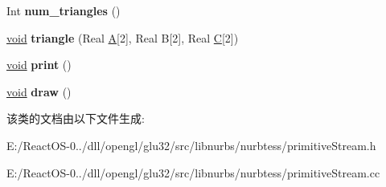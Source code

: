 \begin{DoxyCompactItemize}
\item 
\mbox{\label{classprim_stream_a7b0d2d0e3cfaba72c8f1ad67250daff1}} 
Int {\bfseries num\+\_\+triangles} ()
\item 
\mbox{\label{classprim_stream_a6aeafdafa7ab36759b011649fea772bc}} 
\hyperlink{interfacevoid}{void} {\bfseries triangle} (Real \hyperlink{struct_a}{A}\mbox{[}2\mbox{]}, Real B\mbox{[}2\mbox{]}, Real \hyperlink{struct_c}{C}\mbox{[}2\mbox{]})
\item 
\mbox{\label{classprim_stream_af4f98619102b2c8b694631f3d9418929}} 
\hyperlink{interfacevoid}{void} {\bfseries print} ()
\item 
\mbox{\label{classprim_stream_aa1bcabaedda24e933956f3be6cbb5c94}} 
\hyperlink{interfacevoid}{void} {\bfseries draw} ()
\end{DoxyCompactItemize}


该类的文档由以下文件生成\+:\begin{DoxyCompactItemize}
\item 
E\+:/\+React\+O\+S-\/0../dll/opengl/glu32/src/libnurbs/nurbtess/primitive\+Stream.\+h\item 
E\+:/\+React\+O\+S-\/0../dll/opengl/glu32/src/libnurbs/nurbtess/primitive\+Stream.\+cc\end{DoxyCompactItemize}
